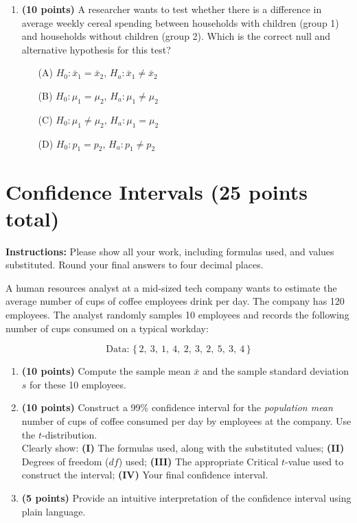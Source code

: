 \documentclass{article}
\newcommand{\blankbox}[2][3cm]{%
    \vspace{-0.5em}
    \begin{figure}[H]
        \makebox[\linewidth]{%
            \begin{tcolorbox}[
                colback=white,
                colframe=white,  %
                width=#2, %
                height=#1,
                boxrule=0.2mm
            ]
            \end{tcolorbox}
        }
    \end{figure}
    \vspace{-2em}
}
\begin{document}
\begin{enumerate}
    \item \textbf{(10 points)} A researcher wants to test whether there is a difference in average weekly cereal spending between households with children (group 1) and households without children (group 2). Which is the correct null and alternative hypothesis for this test?

    \begin{enumerate}
        \item[(A)] $H_0: \bar{x}_1 = \bar{x}_2$, $H_a: \bar{x}_1 \neq \bar{x}_2$
        \item[(B)] $H_0: \mu_1 = \mu_2$, $H_a: \mu_1 \neq \mu_2$
        \item[(C)] $H_0: \mu_1 \neq \mu_2$, $H_a: \mu_1 = \mu_2$
        \item[(D)]  $H_0: p_1 = p_2$, $H_a: p_1 \neq p_2$
    \end{enumerate}
    \blankbox[2cm]{1.0\linewidth}



\end{enumerate}


\newpage
\section{Confidence Intervals (25 points total)}
\noindent\textbf{Instructions:} Please show all your work, including formulas used, and values substituted. Round your final answers to four decimal places.

\bigskip
\noindent A human resources analyst at a mid-sized tech company wants to estimate the average number of cups of coffee employees drink per day. The company has 120 employees. The analyst randomly samples 10 employees and records the following number of cups consumed on a typical workday:

\[
\text{Data: } \{\, 2,\ 3,\ 1,\ 4,\ 2,\ 3,\ 2,\ 5,\ 3,\ 4 \,\}
\]

\begin{enumerate}
    \item \textbf{(10 points)} Compute the sample mean $\bar{x}$ and the sample standard deviation $s$ for these 10 employees. \blankbox[6cm]{1.0\linewidth}

    \item \textbf{(10 points)} Construct a 99\% confidence interval for the \emph{population mean} number of cups of coffee consumed per day by employees at the company. Use the $t$-distribution. \\ Clearly show:
    \textbf{(I)} The formulas used, along with the substituted values;
    \textbf{(II)} Degrees of freedom ($df$) used;
    \textbf{(III)} The appropriate Critical $t$-value used to construct the interval;
    \textbf{(IV)} Your final confidence interval.
    \blankbox[8.5cm]{1.0\linewidth}

    \item \textbf{(5 points)} Provide an intuitive interpretation of the confidence interval using plain language. \blankbox[3cm]{1.0\linewidth}
\end{enumerate}


\end{document}
